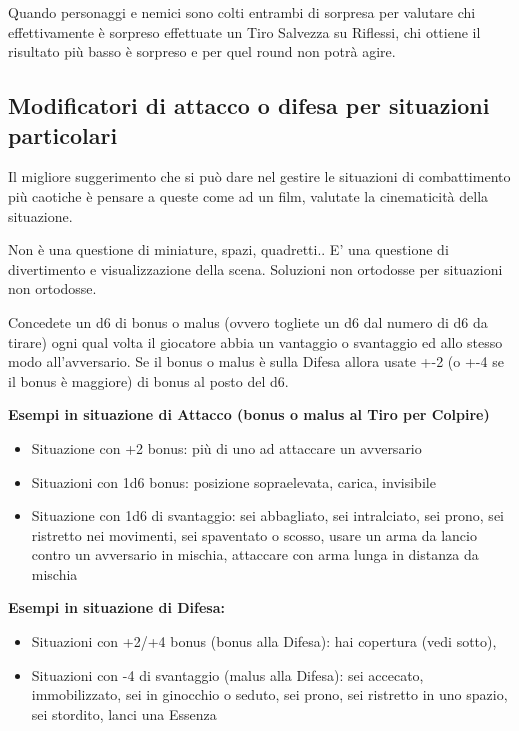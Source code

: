 \documentclass[a4paper,11pt,twoside,openany]{book}
\begin{document}
Quando personaggi e nemici sono colti entrambi di sorpresa per valutare chi effettivamente è sorpreso effettuate un Tiro Salvezza su Riflessi, chi ottiene il risultato più basso è sorpreso e per quel round non potrà agire.

\subsection{Modificatori di attacco o difesa per situazioni particolari} 

Il migliore suggerimento che si può dare nel gestire le situazioni di combattimento più caotiche è pensare a queste come ad un film, valutate la cinematicità della situazione.

Non è una questione di miniature, spazi, quadretti.. E' una questione di divertimento e visualizzazione della scena. Soluzioni non ortodosse per situazioni non ortodosse.

Concedete un d6 di bonus o malus (ovvero togliete un d6 dal numero di d6 da tirare) ogni qual volta il giocatore abbia un vantaggio o svantaggio ed allo stesso modo all'avversario. Se il bonus o malus è sulla Difesa allora usate +-2 (o +-4 se il bonus è maggiore) di bonus al posto del d6.

\bigskip

\textbf{Esempi in situazione di Attacco (bonus o malus al Tiro per Colpire)}

\begin{itemize}
	\item Situazione con +2 bonus: più di uno ad attaccare un avversario

	\item Situazioni con 1d6 bonus: posizione sopraelevata, carica, invisibile

	\item Situazione con 1d6 di svantaggio: sei abbagliato, sei intralciato, sei prono, sei ristretto nei movimenti, sei spaventato o scosso, usare un arma da lancio contro un avversario in mischia, attaccare con arma lunga in distanza da mischia
\end{itemize}

\textbf{Esempi in situazione di Difesa:}

\begin{itemize}
	\item Situazioni con +2/+4 bonus (bonus alla Difesa): hai copertura (vedi sotto),

	\item Situazioni con -4 di svantaggio (malus alla Difesa): sei accecato, immobilizzato, sei in ginocchio o seduto, sei prono, sei ristretto in uno spazio, sei stordito, lanci una Essenza
\end{itemize}
\end{document}
